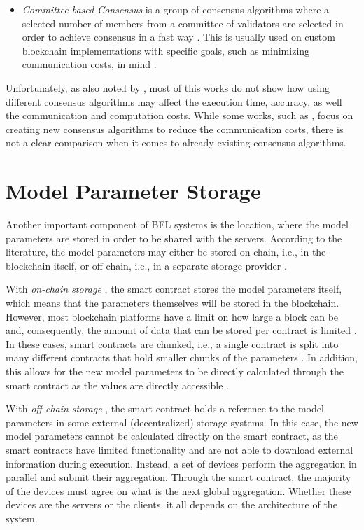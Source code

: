 \begin{itemize}
    \item \textit{Committee-based Consensus} is a group of consensus algorithms where a selected number of members from a committee of validators are selected in order to achieve consensus in a fast way \cite{qu_blockchain-enabled_2022}. This is usually used on custom blockchain implementations with specific goals, such as minimizing communication costs, in mind \cite{9293091}.
\end{itemize}

Unfortunately, as also noted by \cite{9403374}, most of this works do not show how using different consensus algorithms may affect the execution time, accuracy, as well the communication and computation costs. While some works, such as \cite{9293091}, focus on creating new consensus algorithms to reduce the communication costs, there is not a clear comparison when it comes to already existing consensus algorithms.

\section{Model Parameter Storage}\label{related_work:param_storage}

Another important component of BFL systems is the location, where the model parameters are stored in order to be shared with the servers. According to the literature, the model parameters may either be stored on-chain, i.e., in the blockchain itself, or off-chain, i.e., in a separate storage provider \cite{10.48550/arxiv.2104.10501}.

With \textit{on-chain storage} \cite{9274451, baffle, demo, 8733825, 9524833, 8894364, 9184854, 8893114}, the smart contract stores the model parameters itself, which means that the parameters themselves will be stored in the blockchain. However, most blockchain platforms have a limit on how large a block can be and, consequently, the amount of data that can be stored per contract is limited \cite{9274451}. In these cases, smart contracts are chunked, i.e., a single contract is split into many different contracts that hold smaller chunks of the parameters \cite{baffle}. In addition, this allows for the new model parameters to be directly calculated through the smart contract as the values are directly accessible  \cite{9274451}.
    
With \textit{off-chain storage} \cite{10.1145/3319535.3363256, 10.48550/arxiv.2011.07516, 8945913, 10.48550/arxiv.2202.02817, 10.48550/arxiv.2007.03856, 10.48550/arxiv.1910.12603, Peyvandi2022, 9170559}, the smart contract holds a reference to the model parameters in some external (decentralized) storage systems. In this case, the new model parameters cannot be calculated directly on the smart contract, as the smart contracts have limited functionality and are not able to download external information during execution. Instead, a set of devices perform the aggregation in parallel and submit their aggregation. Through the smart contract, the majority of the devices must agree on what is the next global aggregation. Whether these devices are the servers or the clients, it all depends on the architecture of the system.

